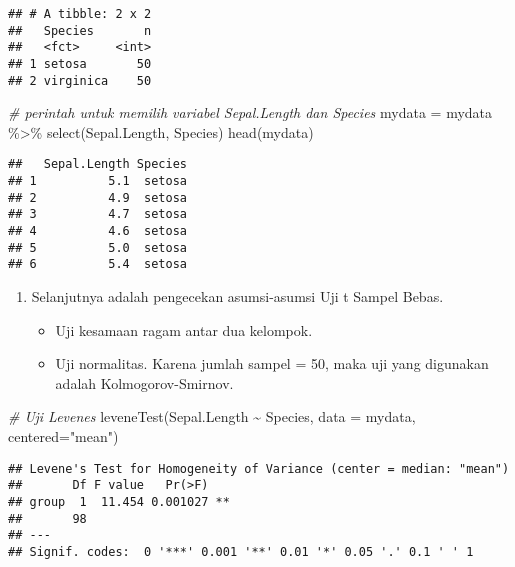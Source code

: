 \documentclass[
]{book}
\newenvironment{Shaded}{\begin{snugshade}}{\end{snugshade}}
\newcommand{\AttributeTok}[1]{\textcolor[rgb]{0.77,0.63,0.00}{#1}}
\newcommand{\CommentTok}[1]{\textcolor[rgb]{0.56,0.35,0.01}{\textit{#1}}}
\newcommand{\FunctionTok}[1]{\textcolor[rgb]{0.00,0.00,0.00}{#1}}
\newcommand{\NormalTok}[1]{#1}
\newcommand{\OtherTok}[1]{\textcolor[rgb]{0.56,0.35,0.01}{#1}}
\newcommand{\SpecialCharTok}[1]{\textcolor[rgb]{0.00,0.00,0.00}{#1}}
\newcommand{\StringTok}[1]{\textcolor[rgb]{0.31,0.60,0.02}{#1}}
\providecommand{\tightlist}{%
  \setlength{\itemsep}{0pt}\setlength{\parskip}{0pt}}
\begin{document}
\begin{verbatim}
## # A tibble: 2 x 2
##   Species       n
##   <fct>     <int>
## 1 setosa       50
## 2 virginica    50
\end{verbatim}

\begin{Shaded}
\begin{Highlighting}[]
\CommentTok{\# perintah untuk memilih variabel Sepal.Length dan Species}
\NormalTok{mydata }\OtherTok{=}\NormalTok{ mydata }\SpecialCharTok{\%\textgreater{}\%} \FunctionTok{select}\NormalTok{(Sepal.Length, Species)}
\FunctionTok{head}\NormalTok{(mydata)}
\end{Highlighting}
\end{Shaded}

\begin{verbatim}
##   Sepal.Length Species
## 1          5.1  setosa
## 2          4.9  setosa
## 3          4.7  setosa
## 4          4.6  setosa
## 5          5.0  setosa
## 6          5.4  setosa
\end{verbatim}

\begin{enumerate}
\def\labelenumi{\arabic{enumi}.}
\setcounter{enumi}{2}
\tightlist
\item
  Selanjutnya adalah pengecekan asumsi-asumsi Uji t Sampel Bebas.

  \begin{itemize}
  \tightlist
  \item
    Uji kesamaan ragam antar dua kelompok.
  \item
    Uji normalitas. Karena jumlah sampel = 50, maka uji yang digunakan adalah Kolmogorov-Smirnov.
  \end{itemize}
\end{enumerate}

\begin{Shaded}
\begin{Highlighting}[]
\CommentTok{\# Uji Levene\textquotesingle{}s }
\FunctionTok{leveneTest}\NormalTok{(Sepal.Length }\SpecialCharTok{\textasciitilde{}}\NormalTok{ Species, }\AttributeTok{data =}\NormalTok{ mydata, }\AttributeTok{centered=}\StringTok{"mean"}\NormalTok{)}
\end{Highlighting}
\end{Shaded}

\begin{verbatim}
## Levene's Test for Homogeneity of Variance (center = median: "mean")
##       Df F value   Pr(>F)   
## group  1  11.454 0.001027 **
##       98                    
## ---
## Signif. codes:  0 '***' 0.001 '**' 0.01 '*' 0.05 '.' 0.1 ' ' 1
\end{verbatim}
\end{document}
